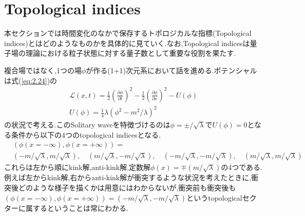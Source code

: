 \documentclass[dvipdfmx,11pt,a4paper]{jsbook}
\begin{document}
\section{Topological indices}
本セクションでは時間変化のなかで保存するトポロジカルな指標(Topological indices)とはどのようなものかを具体的に見ていく.なお,Topological indicesは量子場の理論における粒子状態に対する量子数として重要な役割を果たす.

複合場ではなく,1つの場$\phi$が作る(1+1)次元系において話を進める.ポテンシャルは式(\ref{eq:2.24})の
\begin{align*}
    \mathscr{L}(x, t)=\frac{1}{2}\left(\frac{\partial \phi}{\partial t}\right)^{2}-\frac{1}{2}\left(\frac{\partial \phi}{\partial x}\right)^{2}-U(\phi)\nonumber \\
    U(\phi)=\frac{1}{4}\lambda(\phi^2-m^2/\lambda)^2
\end{align*}
の状況で考える.このSolitary waveを特徴づけるのは$\phi=\pm/\sqrt{\lambda}$で$U(\phi)=0$となる条件から以下の4つのtopological indicesとなる.
\begin{align}
     & \left(\phi(x=-\infty),\phi(x=+\infty)\right)=\nonumber                                                                                                                \\
     & (-m/\sqrt{\lambda},m/\sqrt{\lambda}),\quad (m/\sqrt{\lambda},-m/\sqrt{\lambda}),\quad (-m/\sqrt{\lambda},-m/\sqrt{\lambda}),\quad (m/\sqrt{\lambda},m/\sqrt{\lambda})
\end{align}
これらは左から順にkink解,anti-kink解,定数解$\phi(x)=\mp(m/\sqrt{\lambda})$の4つである.例えば左からkink解,右からanti-kink解が衝突するような状況を考えたときに,衝突後どのような様子を描くかは用意にはわからないが,衝突前も衝突後も$\left(\phi(x=-\infty),\phi(x=+\infty)\right)=(-m/\sqrt{\lambda},-m/\sqrt{\lambda})$というtopologicalセクターに属するということは常にわかる.
\end{document}
